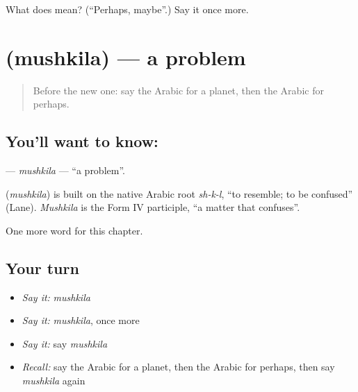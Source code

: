 \begin{tcolorbox}[breakable,colback=teal!4,colframe=teal!35!black,title={Before you move on}]
What does  mean? (\textquotedblleft{}Perhaps, maybe\textquotedblright{}.) Say it once more.
\end{tcolorbox}
\section[\texorpdfstring{\ar{مشكلة} (mushkila)}{مشكلة (mushkila)}]{ (mushkila) — a problem}

\label{lesson:AR-C206-mushkila}



\begin{quote}
Before the new one: say the Arabic for a planet, then the Arabic for perhaps.
\end{quote}

\subsection*{You'll want to know: }
\textbf{} — \emph{mushkila} — \textquotedblleft{}a problem\textquotedblright{}.

\begin{cousinweb}
\textbf{} (\emph{mushkila}) is built on the native Arabic root \emph{sh-k-l}, \textquotedblleft{}to resemble; to be confused\textquotedblright{} (Lane). \emph{Mushkila} is the Form IV participle, \textquotedblleft{}a matter that confuses\textquotedblright{}.
\end{cousinweb}

\begin{grammarlens}[title={What you've built}]
One more word for this chapter.
\end{grammarlens}

\subsection*{Your turn}
\begin{itemize}
\raggedright
  \item \emph{Say it:} \emph{mushkila}
  \item \emph{Say it:} \emph{mushkila}, once more
  \item \emph{Say it:} say \emph{mushkila}
  \item \emph{Recall:} say the Arabic for a planet, then the Arabic for perhaps, then say \emph{mushkila} again
\end{itemize}

